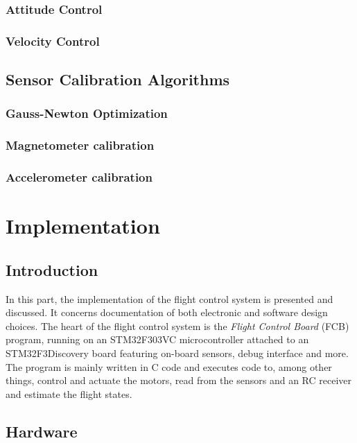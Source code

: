 \documentclass[a4paper]{report}
\begin{document}
	\section{Attitude Control}

	\section{Velocity Control}

\chapter{Sensor Calibration Algorithms}

	\section{Gauss-Newton Optimization}

	\section{Magnetometer calibration}

	\section{Accelerometer calibration}

%
%
\part{Implementation}

\chapter{Introduction}
In this part, the implementation of the flight control system is presented and discussed. It concerns documentation of both electronic and software design choices. The heart of the flight control system is the \emph{Flight Control Board} (FCB) program, running on an STM32F303VC microcontroller attached to an STM32F3Discovery board featuring on-board sensors, debug interface and more. The program is mainly written in C code and executes code to, among other things, control and actuate the motors, read from the sensors and an RC receiver and estimate the flight states.

\chapter{Hardware}
\end{document}
